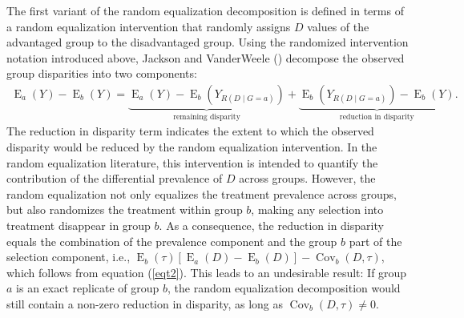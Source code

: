 \documentclass[12pt,a4paper]{article}
\newcommand{\Cov}{\operatorname{Cov}}
\newcommand{\E}{\operatorname{E}}
\begin{document}
The first variant of the random equalization decomposition is defined in terms of a random equalization intervention that randomly assigns $D$ values of the advantaged group to the disadvantaged group.
Using the randomized intervention notation introduced above, Jackson and VanderWeele 
 (\citeyear{jackson_decomposition_2018}) decompose the observed group disparities into two components:
\begin{gather}
\E_a(Y)-\E_b(Y)=\underbrace{\E_a(Y)-\E_b \left(Y_{R(D \mid G=a)} \right)}_{\text{remaining disparity}} + \underbrace{\E_b \left(Y_{R(D \mid G=a)} \right)-\E_b(Y)}_{\text{reduction in disparity}}.  \nonumber 
\end{gather}
The reduction in disparity term indicates the extent to which the observed disparity would be reduced by the random equalization intervention. In the random equalization literature, this intervention is intended to quantify the contribution of the differential prevalence of $D$ across groups. 
However, the random equalization not only equalizes the treatment prevalence across groups, but also randomizes the treatment within group $b$, making any selection into treatment disappear in group $b$. As a consequence, the reduction in disparity equals the combination of the prevalence component and the group $b$ part of the selection component, i.e., $\E_b(\tau)[\E_a(D)-\E_b(D)]-\Cov_b(D, \tau)$, which follows from equation (\ref{eqt2}). This leads to an undesirable result: If group $a$ is an exact replicate of group $b$, the random equalization decomposition would still contain a non-zero reduction in disparity, as long as $\Cov_b(D, \tau) \neq 0$.
\end{document}
